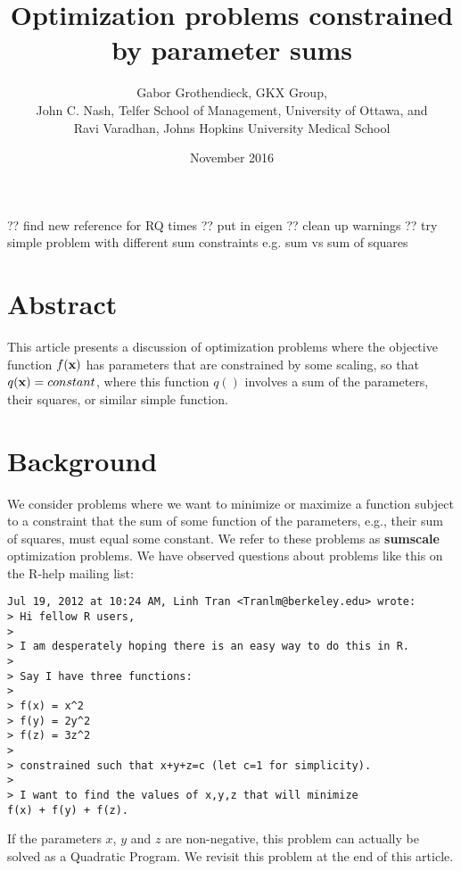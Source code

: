 \documentclass[11pt]{article}\usepackage[]{graphicx}\usepackage[]{color}
\newcommand{\B}[1]{{\bf #1 \rm}}
\begin{document}
?? find new reference for RQ times
?? put in eigen
?? clean up warnings
?? try simple problem with different sum constraints e.g. sum vs sum of squares





\title{Optimization problems constrained by parameter sums}
\author{Gabor Grothendieck, GKX Group,\\
John C. Nash, Telfer School of Management, University of Ottawa, and\\
Ravi Varadhan, Johns Hopkins University Medical School}
\date{November 2016}
\maketitle

\section*{Abstract}

This article presents a discussion of optimization problems where the 
objective function $f(\B{x})$ has parameters that are constrained by some
scaling, so that $q(\B{x}) = constant$, where this function $q()$ involves
a sum of the parameters, their squares, or similar simple function.

\section{Background}

We consider problems where we want to minimize or maximize a function subject to a constraint
that the sum of some function of the parameters, e.g., their sum of squares, must 
equal some constant.
We refer to these problems as \B{sumscale} optimization problems. We have observed questions 
about problems like this on the R-help mailing list: 

\begin{verbatim}
Jul 19, 2012 at 10:24 AM, Linh Tran <Tranlm@berkeley.edu> wrote:
> Hi fellow R users,
>
> I am desperately hoping there is an easy way to do this in R.
>
> Say I have three functions:
>
> f(x) = x^2
> f(y) = 2y^2
> f(z) = 3z^2
>
> constrained such that x+y+z=c (let c=1 for simplicity).
>
> I want to find the values of x,y,z that will minimize 
f(x) + f(y) + f(z).
\end{verbatim}

If the parameters $x$, $y$ and $z$ are non-negative, this problem can actually 
be solved as a Quadratic Program. We revisit this problem at the end of this
article.
\end{document}
